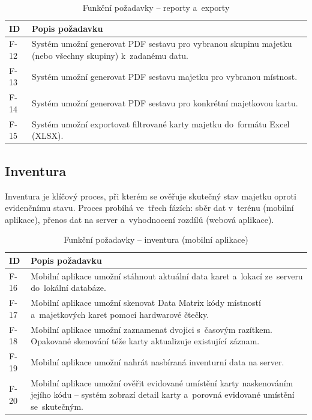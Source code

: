 \begin{table}[H]\centering
\renewcommand{\arraystretch}{1.4}
\caption{Funkční požadavky -- reporty a~exporty}\label{tab:freq-reports}
\begin{tabular}{l|p{10cm}}
	\textbf{ID} & \textbf{Popis požadavku} \tabularnewline \hline
	F-12 & Systém umožní generovat PDF sestavu pro vybranou skupinu majetku (nebo všechny skupiny) k~zadanému datu. \tabularnewline
	F-13 & Systém umožní generovat PDF sestavu majetku pro vybranou místnost. \tabularnewline
	F-14 & Systém umožní generovat PDF sestavu pro konkrétní majetkovou kartu. \tabularnewline
	F-15 & Systém umožní exportovat filtrované karty majetku do~formátu Excel (XLSX). \tabularnewline
\end{tabular}
\end{table}

\subsection{Inventura}

Inventura je klíčový proces, při kterém se ověřuje skutečný stav majetku oproti evidenčnímu stavu. Proces probíhá ve~třech fázích: sběr dat v~terénu (mobilní aplikace), přenos dat na server a~vyhodnocení rozdílů (webová aplikace).

\begin{table}[H]\centering
\renewcommand{\arraystretch}{1.4}
\caption{Funkční požadavky -- inventura (mobilní aplikace)}\label{tab:freq-inventory-mobile}
\begin{tabular}{l|p{10cm}}
	\textbf{ID} & \textbf{Popis požadavku} \tabularnewline \hline
	F-16 & Mobilní aplikace umožní stáhnout aktuální data karet a~lokací ze~serveru do~lokální databáze. \tabularnewline
	F-17 & Mobilní aplikace umožní skenovat Data Matrix kódy místností a~majetkových karet pomocí hardwarové čtečky. \tabularnewline
	F-18 & Mobilní aplikace umožní zaznamenat dvojici \uv{karta -- skutečné umístění} s~časovým razítkem. Opakované skenování téže karty aktualizuje existující záznam. \tabularnewline
	F-19 & Mobilní aplikace umožní nahrát nasbíraná inventurní data na server. \tabularnewline
	F-20 & Mobilní aplikace umožní ověřit evidované umístění karty naskenováním jejího kódu -- systém zobrazí detail karty a~porovná evidované umístění se~skutečným. \tabularnewline
\end{tabular}
\end{table}

